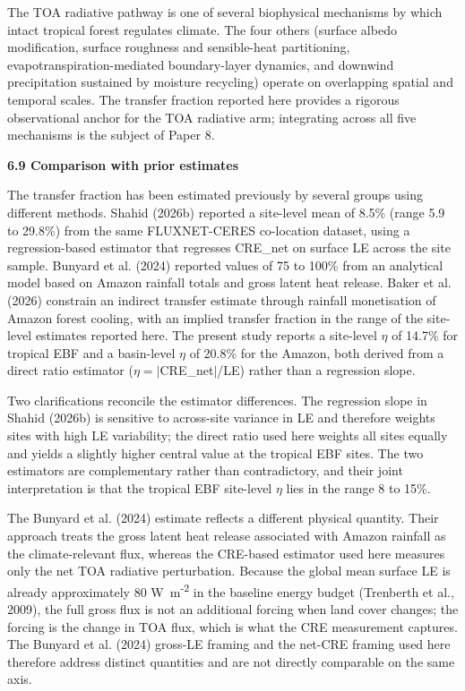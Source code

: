 The TOA radiative pathway is one of several biophysical mechanisms by which intact tropical forest regulates climate. The four others (surface albedo modification, surface roughness and sensible-heat partitioning, evapotranspiration-mediated boundary-layer dynamics, and downwind precipitation sustained by moisture recycling) operate on overlapping spatial and temporal scales. The transfer fraction reported here provides a rigorous observational anchor for the TOA radiative arm; integrating across all five mechanisms is the subject of Paper 8.

\textbf{6.9 Comparison with prior estimates}

The transfer fraction has been estimated previously by several groups using different methods. Shahid (2026b) reported a site-level mean of 8.5\% (range 5.9 to 29.8\%) from the same FLUXNET-CERES co-location dataset, using a regression-based estimator that regresses CRE\_net on surface LE across the site sample. Bunyard et al. (2024) reported values of 75 to 100\% from an analytical model based on Amazon rainfall totals and gross latent heat release. Baker et al. (2026) constrain an indirect transfer estimate through rainfall monetisation of Amazon forest cooling, with an implied transfer fraction in the range of the site-level estimates reported here. The present study reports a site-level \(\eta\) of 14.7\% for tropical EBF and a basin-level \(\eta\) of 20.8\% for the Amazon, both derived from a direct ratio estimator (\(\eta = |\)CRE\_net\(|\)/LE) rather than a regression slope.

Two clarifications reconcile the estimator differences. The regression slope in Shahid (2026b) is sensitive to across-site variance in LE and therefore weights sites with high LE variability; the direct ratio used here weights all sites equally and yields a slightly higher central value at the tropical EBF sites. The two estimators are complementary rather than contradictory, and their joint interpretation is that the tropical EBF site-level \(\eta\) lies in the range 8 to 15\%.

The Bunyard et al. (2024) estimate reflects a different physical quantity. Their approach treats the gross latent heat release associated with Amazon rainfall as the climate-relevant flux, whereas the CRE-based estimator used here measures only the net TOA radiative perturbation. Because the global mean surface LE is already approximately 80 W~m\textsuperscript{-2} in the baseline energy budget (Trenberth et al., 2009), the full gross flux is not an additional forcing when land cover changes; the forcing is the change in TOA flux, which is what the CRE measurement captures. The Bunyard et al. (2024) gross-LE framing and the net-CRE framing used here therefore address distinct quantities and are not directly comparable on the same axis.

